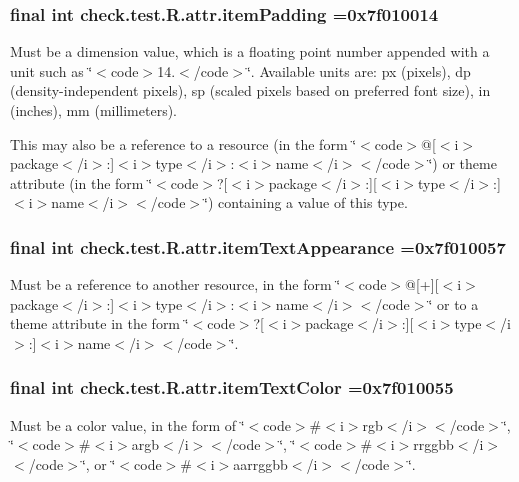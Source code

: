 \subsubsection[{item\+Padding}]{\setlength{\rightskip}{0pt plus 5cm}final int check.\+test.\+R.\+attr.\+item\+Padding =0x7f010014\hspace{0.3cm}{\ttfamily [static]}}\label{classcheck_1_1test_1_1_r_1_1attr_ab2727a6858d6de3d85c2cb2ca13fde08}
Must be a dimension value, which is a floating point number appended with a unit such as \char`\"{}$<$code$>$14.\+5sp$<$/code$>$\char`\"{}. Available units are\+: px (pixels), dp (density-\/independent pixels), sp (scaled pixels based on preferred font size), in (inches), mm (millimeters). 

This may also be a reference to a resource (in the form \char`\"{}$<$code$>$@\mbox{[}$<$i$>$package$<$/i$>$\+:\mbox{]}$<$i$>$type$<$/i$>$\+:$<$i$>$name$<$/i$>$$<$/code$>$\char`\"{}) or theme attribute (in the form \char`\"{}$<$code$>$?\mbox{[}$<$i$>$package$<$/i$>$\+:\mbox{]}\mbox{[}$<$i$>$type$<$/i$>$\+:\mbox{]}$<$i$>$name$<$/i$>$$<$/code$>$\char`\"{}) containing a value of this type. \hypertarget{classcheck_1_1test_1_1_r_1_1attr_a809705d403dcd9aea9a6cb585edd2db3}{}
\subsubsection[{item\+Text\+Appearance}]{\setlength{\rightskip}{0pt plus 5cm}final int check.\+test.\+R.\+attr.\+item\+Text\+Appearance =0x7f010057\hspace{0.3cm}{\ttfamily [static]}}\label{classcheck_1_1test_1_1_r_1_1attr_a809705d403dcd9aea9a6cb585edd2db3}
Must be a reference to another resource, in the form \char`\"{}$<$code$>$@\mbox{[}+\mbox{]}\mbox{[}$<$i$>$package$<$/i$>$\+:\mbox{]}$<$i$>$type$<$/i$>$\+:$<$i$>$name$<$/i$>$$<$/code$>$\char`\"{} or to a theme attribute in the form \char`\"{}$<$code$>$?\mbox{[}$<$i$>$package$<$/i$>$\+:\mbox{]}\mbox{[}$<$i$>$type$<$/i$>$\+:\mbox{]}$<$i$>$name$<$/i$>$$<$/code$>$\char`\"{}. \hypertarget{classcheck_1_1test_1_1_r_1_1attr_ae472660038cfb76060dc9b0f251d8d58}{}
\subsubsection[{item\+Text\+Color}]{\setlength{\rightskip}{0pt plus 5cm}final int check.\+test.\+R.\+attr.\+item\+Text\+Color =0x7f010055\hspace{0.3cm}{\ttfamily [static]}}\label{classcheck_1_1test_1_1_r_1_1attr_ae472660038cfb76060dc9b0f251d8d58}
Must be a color value, in the form of \char`\"{}$<$code$>$\#$<$i$>$rgb$<$/i$>$$<$/code$>$\char`\"{}, \char`\"{}$<$code$>$\#$<$i$>$argb$<$/i$>$$<$/code$>$\char`\"{}, \char`\"{}$<$code$>$\#$<$i$>$rrggbb$<$/i$>$$<$/code$>$\char`\"{}, or \char`\"{}$<$code$>$\#$<$i$>$aarrggbb$<$/i$>$$<$/code$>$\char`\"{}. 

